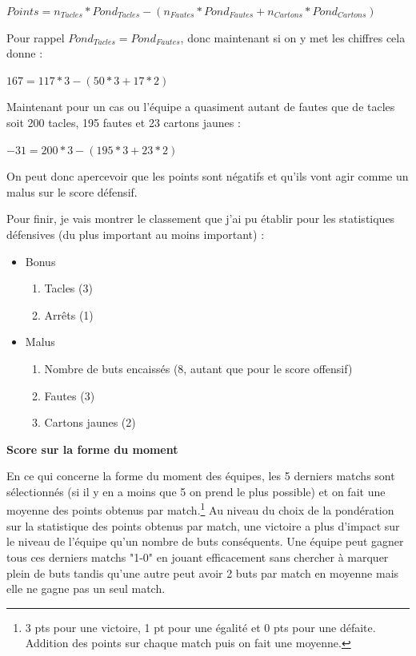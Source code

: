\documentclass[a4paper,14pt]{extarticle}
\begin{document}
{$Points = n_{Tacles} * Pond_{Tacles} - (n_{Fautes} * Pond_{Fautes} + n_{Cartons} * Pond_{Cartons})$ 


Pour rappel $Pond_{Tacles}=Pond_{Fautes}$, donc maintenant si on y met les chiffres cela donne : 

$167 = 117 * 3 - (50 * 3 + 17 * 2)$

Maintenant pour un cas ou l'équipe a quasiment autant de fautes que de tacles soit 200 tacles, 195 fautes et 23 cartons jaunes : 

$-31 = 200 * 3 - (195 * 3 + 23 * 2)$

On peut donc apercevoir que les points sont négatifs et qu'ils vont agir comme un malus sur le score défensif.

Pour finir, je vais montrer le classement que j'ai pu établir pour les statistiques défensives (du plus important au moins important) :
\begin{itemize}
    \item Bonus
    \begin{enumerate}
        \item Tacles (3)
        \item Arrêts (1)
    \end{enumerate}
    \item Malus
    \begin{enumerate}
        \item Nombre de buts encaissés (8, autant que pour le score offensif)
        \item Fautes (3)
        \item Cartons jaunes (2)
    \end{enumerate}
\end{itemize}

\newpage

\noindent\textbf{Score sur la forme du moment}

En ce qui concerne la forme du moment des équipes, les 5 derniers matchs sont sélectionnés (si il y en a moins que 5 on prend le plus possible) et on fait une moyenne des points obtenus par match.\footnote{3 pts pour une victoire, 1 pt pour une égalité et 0 pts pour une défaite. Addition des points sur chaque match puis on fait une moyenne.} 
Au niveau du choix de la pondération sur la statistique des points obtenus par match, une victoire a plus d'impact sur le niveau de l'équipe qu'un nombre de buts conséquents. Une équipe peut gagner tous ces derniers matchs "1-0" en jouant efficacement sans chercher à marquer plein de buts tandis qu'une autre peut avoir 2 buts par match en moyenne mais elle ne gagne pas un seul match.

}
\end{document}
